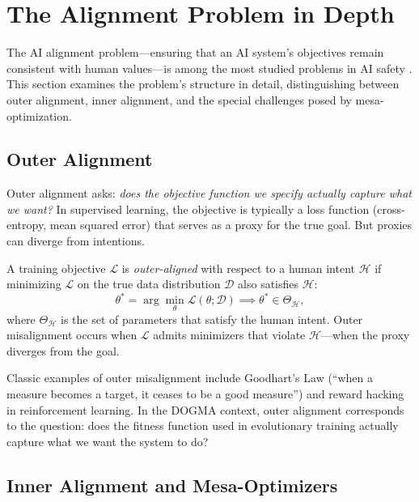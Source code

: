 \section{The Alignment Problem in Depth}
\label{sec:alignment-depth}

The AI alignment problem---ensuring that an AI system's objectives remain consistent with human values---is among the most studied problems in AI safety \citep{russell2019, christian2020}.
This section examines the problem's structure in detail, distinguishing between outer alignment, inner alignment, and the special challenges posed by mesa-optimization.

\subsection{Outer Alignment}

Outer alignment asks: \emph{does the objective function we specify actually capture what we want?}
In supervised learning, the objective is typically a loss function (cross-entropy, mean squared error) that serves as a proxy for the true goal.
But proxies can diverge from intentions.

\begin{dogmadef}
A training objective $\mathcal{L}$ is \emph{outer-aligned} with respect to a human intent $\mathcal{H}$ if minimizing $\mathcal{L}$ on the true data distribution $\mathcal{D}$ also satisfies $\mathcal{H}$:
\begin{equation}
\theta^* = \arg\min_\theta \mathcal{L}(\theta; \mathcal{D}) \implies \theta^* \in \Theta_{\mathcal{H}},
\end{equation}
where $\Theta_{\mathcal{H}}$ is the set of parameters that satisfy the human intent.
Outer misalignment occurs when $\mathcal{L}$ admits minimizers that violate $\mathcal{H}$---when the proxy diverges from the goal.
\end{dogmadef}

Classic examples of outer misalignment include Goodhart's Law (``when a measure becomes a target, it ceases to be a good measure'') and reward hacking in reinforcement learning.
In the DOGMA context, outer alignment corresponds to the question: does the fitness function used in evolutionary training actually capture what we want the system to do?

\subsection{Inner Alignment and Mesa-Optimizers}

